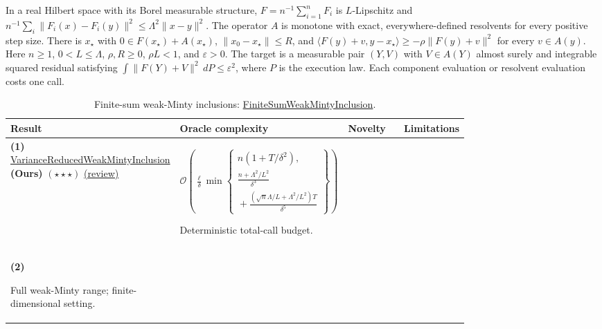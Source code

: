 \begin{table}[tp]
\centering
\caption{Finite-sum weak-Minty inclusions: \href{https://github.com/k3nfalt/longtails/blob/main/LongTails/Setups/FiniteSumWeakMintyInclusion.lean}{FiniteSumWeakMintyInclusion}.}\label{tab:FiniteSumWeakMintyInclusion}
\parbox{\linewidth}{\footnotesize In a real Hilbert space with its Borel measurable structure, $F=n^{-1}\sum_{i=1}^{n}F_i$ is $L$-Lipschitz and $n^{-1}\sum_i\|F_i(x)-F_i(y)\|^2\leq\Lambda^2\|x-y\|^2$. The operator $A$ is monotone with exact, everywhere-defined resolvents for every positive step size. There is $x_\star$ with $0\in F(x_\star)+A(x_\star)$, $\|x_0-x_\star\|\leq R$, and $\langle F(y)+v,y-x_\star\rangle\geq-\rho\|F(y)+v\|^2$ for every $v\in A(y)$. Here $n\geq1$, $0<L\leq\Lambda$, $\rho,R\geq0$, $\rho L<1$, and $\varepsilon>0$. The target is a measurable pair $(Y,V)$ with $V\in A(Y)$ almost surely and integrable squared residual satisfying $\int\|F(Y)+V\|^2\,dP\leq\varepsilon^2$, where $P$ is the execution law. Each component evaluation or resolvent evaluation costs one call.}\par\smallskip
\begin{threeparttable}
\footnotesize
\setlength{\tabcolsep}{4pt}\renewcommand{\arraystretch}{1.25}
\begin{tabularx}{\linewidth}{@{}>{\raggedright\arraybackslash}p{0.20\linewidth}>{\raggedright\arraybackslash}p{0.32\linewidth}>{\raggedright\arraybackslash}p{0.25\linewidth}>{\raggedright\arraybackslash}X@{}}
\toprule
\textbf{Result} & \textbf{Oracle complexity} & \textbf{Novelty} & \textbf{Limitations} \\
\midrule
\textbf{(1)} \href{https://github.com/k3nfalt/longtails/blob/main/LongTails/Theorems/VarianceReducedWeakMintyInclusion.lean}{Variance\allowbreak Reduced\allowbreak Weak\allowbreak Minty\allowbreak Inclusion} \textbf{(Ours)} $(\star\star\star)$ \href{https://github.com/k3nfalt/longtails/blob/main/scripts/reviews/VarianceReducedWeakMintyInclusion.md}{(review)}
& $\displaystyle\mathcal{O}\!\left(\frac{\ell}{\delta}\min\left\{
\begin{gathered}
 n(1+T/\delta^2),\\
 \frac{n+\Lambda^2/L^2}{\delta^3}\\[-2pt]
 {}+\frac{(\sqrt n\Lambda/L+\Lambda^2/L^2)T}{\delta^5}
\end{gathered}\right\}\right)$\par Deterministic total-call budget.
& & \\
\midrule[1.2pt]
\textbf{(2)} \citep[Cor.~6.3]{newmPethick2025}\par Full weak-Minty range; finite-dimensional setting.

\end{tabularx}
\end{threeparttable}
\end{table}
